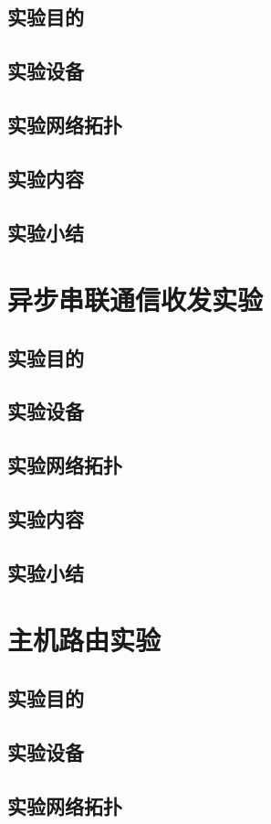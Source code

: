 \documentclass[lang=cn,11pt,a4paper,cite=authoryear]{elegantpaper}
\begin{document}
\subsection{实验目的}
\subsection{实验设备}
\subsection{实验网络拓扑}
\subsection{实验内容}
\subsection{实验小结}
\section{异步串联通信收发实验}
\subsection{实验目的}
\subsection{实验设备}
\subsection{实验网络拓扑}
\subsection{实验内容}
\subsection{实验小结}
\section{主机路由实验}
\subsection{实验目的}
\subsection{实验设备}
\subsection{实验网络拓扑}
\end{document}
